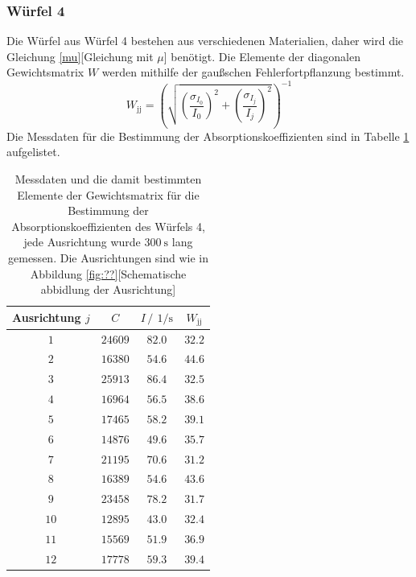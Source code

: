 \subsubsection{Würfel 4}
Die Würfel aus Würfel 4 bestehen aus verschiedenen Materialien, daher wird die Gleichung \ref{mu}[Gleichung mit $\mu$] benötigt.
Die Elemente der diagonalen Gewichtsmatrix $W$ werden mithilfe der gaußschen Fehlerfortpflanzung bestimmt.
\begin{equation*}
    W_{\text{jj}}= \left(\sqrt{\left(\frac{\sigma_{I_0}}{I_0}\right)^2+ \left(\frac{\sigma_{I_j}}{I_j}\right)^2}\right)^{-1}
\end{equation*}
Die Messdaten für die Bestimmung der Absorptionskoeffizienten sind in Tabelle \ref{tab:Messdaten_Würfel4} aufgelistet.
\FloatBarrier
\begin{table}
    \centering
    \caption{Messdaten und die damit bestimmten Elemente der Gewichtsmatrix für die Bestimmung der Absorptionskoeffizienten des Würfels 4, jede Ausrichtung wurde $\SI{300}{\second}$ lang gemessen. Die Ausrichtungen sind wie in Abbildung \ref{fig:??}[Schematische abbidlung der Ausrichtung]}
    \label{tab:Messdaten_Würfel4}
    \begin{tabular}{c c c c}
        \toprule
        Ausrichtung $j$&$C$&$I\,/\,\SI{}{1\per\second}$&$W_{\text{jj}}$\\
        \midrule
        $\num{1}$&$\num{24609}$&$\num{82.0}$ &$\num{32.2}$\\
        $\num{2}$&$\num{16380}$&$\num{54.6}$ &$\num{44.6}$\\
        $\num{3}$&$\num{25913}$&$\num{86.4}$ &$\num{32.5}$\\
        $\num{4}$&$\num{16964}$&$\num{56.5}$ &$\num{38.6}$\\
        $\num{5}$&$\num{17465}$&$\num{58.2}$ &$\num{39.1}$\\
        $\num{6}$&$\num{14876}$&$\num{49.6}$ &$\num{35.7}$\\
        $\num{7}$&$\num{21195}$&$\num{70.6}$ &$\num{31.2}$\\
        $\num{8}$&$\num{16389}$&$\num{54.6}$ &$\num{43.6}$\\
        $\num{9}$&$\num{23458}$&$\num{78.2}$ &$\num{31.7}$\\
        $\num{10}$&$\num{12895}$&$\num{43.0}$&$\num{32.4}$\\
        $\num{11}$&$\num{15569}$&$\num{51.9}$&$\num{36.9}$\\
        $\num{12}$&$\num{17778}$&$\num{59.3}$&$\num{39.4}$\\
        \bottomrule
    \end{tabular}
\end{table}
